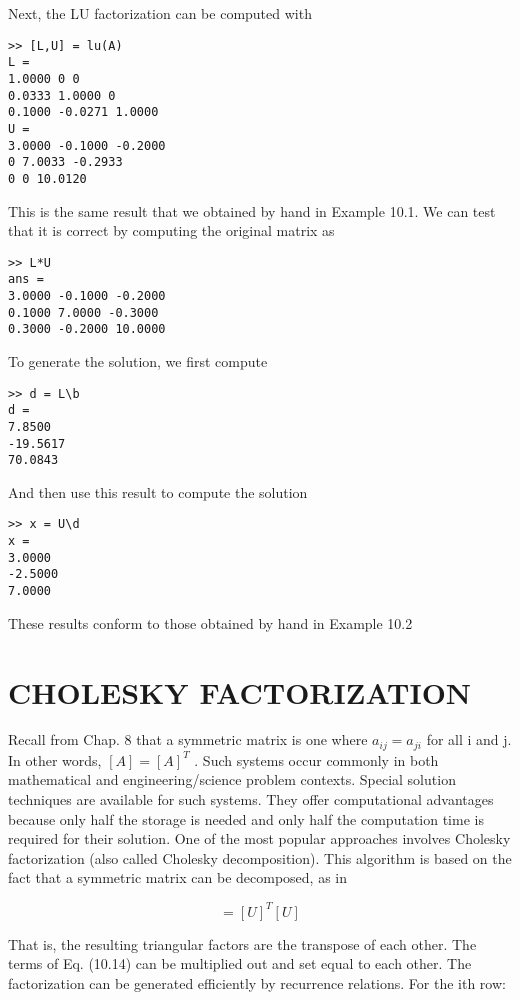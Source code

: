 \documentclass[../main.tex]{subfiles}
\begin{document}
Next, the LU factorization can be computed with

\begin{lstlisting}[numbers=none]
>> [L,U] = lu(A)
L =
1.0000 0 0
0.0333 1.0000 0
0.1000 -0.0271 1.0000
U =
3.0000 -0.1000 -0.2000
0 7.0033 -0.2933
0 0 10.0120
\end{lstlisting}

This is the same result that we obtained by hand in Example 10.1. We can test that it is correct by computing the original matrix as

\begin{lstlisting}[numbers=none]
>> L*U
ans =
3.0000 -0.1000 -0.2000
0.1000 7.0000 -0.3000
0.3000 -0.2000 10.0000
\end{lstlisting}

To generate the solution, we first compute

\begin{lstlisting}[numbers=none]
>> d = L\b
d =
7.8500
-19.5617
70.0843
\end{lstlisting}

And then use this result to compute the solution

\begin{lstlisting}[numbers=none]
>> x = U\d
x =
3.0000
-2.5000
7.0000
\end{lstlisting}

These results conform to those obtained by hand in Example 10.2

\section{CHOLESKY FACTORIZATION}

Recall from Chap. 8 that a symmetric matrix is one where $a_{ij} = a_{ji}$ for all i and j. In other words, $[A] = [A]^{T}$ . Such systems occur commonly in both mathematical and engineering/science problem contexts.
Special solution techniques are available for such systems. They offer computational
advantages because only half the storage is needed and only half the computation time is
required for their solution.
One of the most popular approaches involves Cholesky factorization (also called
Cholesky decomposition). This algorithm is based on the fact that a symmetric matrix can
be decomposed, as in

\begin{equation}
[A] = [U]^{T} [U]
\tag{10.14}
\end{equation}

That is, the resulting triangular factors are the transpose of each other.
The terms of Eq. (10.14) can be multiplied out and set equal to each other. The factorization can be generated efficiently by recurrence relations. For the ith row:
\end{document}
